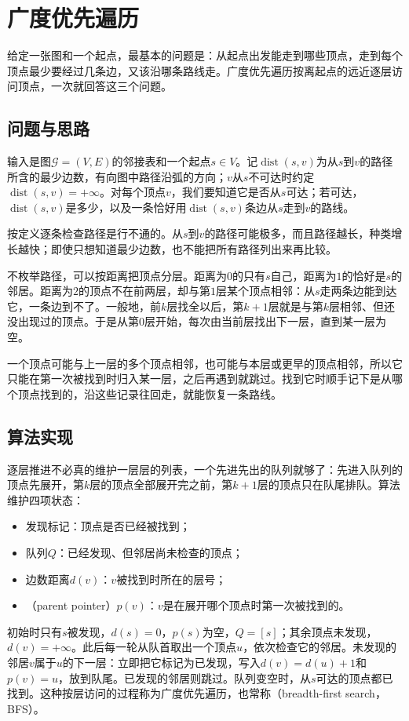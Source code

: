 \section{广度优先遍历}
\label{sec:graph-bfs}

给定一张图和一个起点，最基本的问题是：从起点出发能走到哪些顶点，走到每个顶点最少要经过几条边，又该沿哪条路线走。广度优先遍历按离起点的远近逐层访问顶点，一次就回答这三个问题。

\subsection{问题与思路}
\label{sec:graph-trav-bfs-problem}

输入是图$\mathcal G=(V,E)$的邻接表和一个起点$s\in V$。记$\operatorname{dist}(s,v)$为从$s$到$v$的路径所含的最少边数，有向图中路径沿弧的方向；$v$从$s$不可达时约定$\operatorname{dist}(s,v)=+\infty$。对每个顶点$v$，我们要知道它是否从$s$可达；若可达，$\operatorname{dist}(s,v)$是多少，以及一条恰好用$\operatorname{dist}(s,v)$条边从$s$走到$v$的路线。

按定义逐条检查路径是行不通的。从$s$到$v$的路径可能极多，而且路径越长，种类增长越快；即使只想知道最少边数，也不能把所有路径列出来再比较。

不枚举路径，可以按距离把顶点分层。距离为$0$的只有$s$自己，距离为$1$的恰好是$s$的邻居。距离为$2$的顶点不在前两层，却与第$1$层某个顶点相邻：从$s$走两条边能到达它，一条边到不了。一般地，前$k$层找全以后，第$k+1$层就是与第$k$层相邻、但还没出现过的顶点。于是从第$0$层开始，每次由当前层找出下一层，直到某一层为空。

一个顶点可能与上一层的多个顶点相邻，也可能与本层或更早的顶点相邻，所以它只能在第一次被找到时归入某一层，之后再遇到就跳过。找到它时顺手记下是从哪个顶点找到的，沿这些记录往回走，就能恢复一条路线。

\subsection{算法实现}
\label{sec:graph-trav-bfs-algorithm}

逐层推进不必真的维护一层层的列表，一个先进先出的队列就够了：先进入队列的顶点先展开，第$k$层的顶点全部展开完之前，第$k+1$层的顶点只在队尾排队。算法维护四项状态：
\begin{itemize}
  \item 发现标记：顶点是否已经被找到；
  \item 队列$Q$：已经发现、但邻居尚未检查的顶点；
  \item 边数距离$d(v)$：$v$被找到时所在的层号；
  \item {}（parent pointer）$p(v)$：$v$是在展开哪个顶点时第一次被找到的。
\end{itemize}
初始时只有$s$被发现，$d(s)=0$，$p(s)$为空，$Q=[s]$；其余顶点未发现，$d(v)=+\infty$。此后每一轮从队首取出一个顶点$u$，依次检查它的邻居。未发现的邻居$v$属于$u$的下一层：立即把它标记为已发现，写入$d(v)=d(u)+1$和$p(v)=u$，放到队尾。已发现的邻居则跳过。队列变空时，从$s$可达的顶点都已找到。这种按层访问的过程称为广度优先遍历，也常称（breadth-first search，BFS）。

